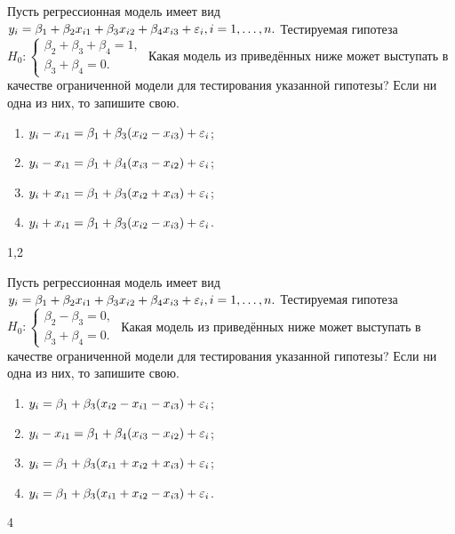 \begin{problem}
Пусть регрессионная модель имеет вид $y_i= \beta_1+ \beta_2 x_{i1}+ \beta_3 x_{i2}+ \beta_4 x_{i3}+\varepsilon_i, i=1,\dots,n.$ Тестируемая гипотеза
$H_0:
  \begin{cases}
    \beta_2+ \beta_3+ \beta_4=1, \\
    \beta_3+ \beta_4=0.
 \end{cases}$
Какая модель из приведённых ниже может выступать в качестве ограниченной модели для тестирования указанной гипотезы? Если ни одна из них, то запишите свою.
\begin{enumerate}
\item $y_i-x_{i1} = \beta_1+ \beta_3 (x_{i2}-x_{i3})+ \varepsilon_i$;
\item $y_i-x_{i1} = \beta_1+ \beta_4 (x_{i3}-x_{i2})+ \varepsilon_i$;
\item $y_i+x_{i1} = \beta_1+ \beta_3 (x_{i2}+x_{i3})+ \varepsilon_i$;
\item $y_i+x_{i1} = \beta_1+ \beta_3 (x_{i2}-x_{i3})+ \varepsilon_i$.
\end{enumerate}


\begin{sol}
1,2
\end{sol}
\end{problem}



\begin{problem} %
 Пусть регрессионная модель имеет вид $y_i= \beta_1+ \beta_2 x_{i1}+ \beta_3 x_{i2}+ \beta_4 x_{i3}+\varepsilon_i, i=1,\dots,n.$ Тестируемая гипотеза
$H_0:
  \begin{cases}
    \beta_2 - \beta_3=0, \\
    \beta_3 + \beta_4=0.
 \end{cases}$
Какая модель из приведённых ниже может выступать в качестве ограниченной модели для тестирования указанной гипотезы? Если ни одна из них, то запишите свою.
\begin{enumerate}
\item $y_i = \beta_1 + \beta_3 (x_{i2}-x_{i1}-x_{i3})+ \varepsilon_i$;
\item $y_i-x_{i1} = \beta_1+ \beta_4 (x_{i3}-x_{i2})+ \varepsilon_i$;
\item $y_i = \beta_1+ \beta_3 (x_{i1}+x_{i2}+x_{i3})+ \varepsilon_i$;
\item $y_i = \beta_1+ \beta_3 (x_{i1}+x_{i2}-x_{i3})+ \varepsilon_i$.
\end{enumerate}


\begin{sol}
4
\end{sol}
\end{problem}



